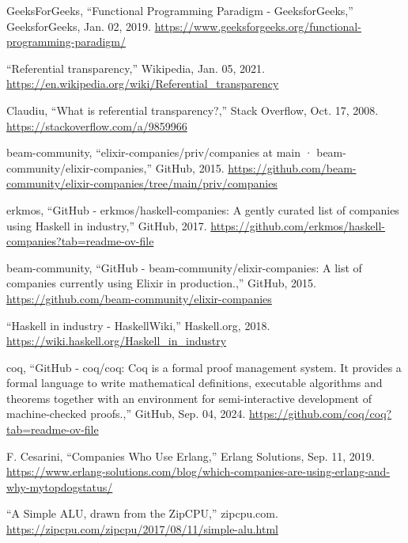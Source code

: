 \documentclass[12pt]{report} %
\begin{document}
\begin{singlespace}
\begin{thebibliography}{}
             GeeksForGeeks, “Functional Programming Paradigm - GeeksforGeeks,” GeeksforGeeks, Jan. 02, 2019. \href{https://www.geeksforgeeks.org/functional-programming-paradigm/}{https://www.geeksforgeeks.org/functional-programming-paradigm/}

             “Referential transparency,” Wikipedia, Jan. 05, 2021. \href{https://en.wikipedia.org/wiki/Referential\_transparency}{https://en.wikipedia.org/wiki/Referential\_transparency}

             Claudiu, “What is referential transparency?,” Stack Overflow, Oct. 17, 2008. \href{https://stackoverflow.com/a/9859966}{https://stackoverflow.com/a/9859966}

             beam-community, “elixir-companies/priv/companies at main · beam-community/elixir-companies,” GitHub, 2015. \href{https://github.com/beam-community/elixir-companies/tree/main/priv/companies}{https://github.com/beam-community/elixir-companies/tree/main/priv/companies}

             erkmos, “GitHub - erkmos/haskell-companies: A gently curated list of companies using Haskell in industry,” GitHub, 2017. \href{https://github.com/erkmos/haskell-companies?tab=readme-ov-file}{https://github.com/erkmos/haskell-companies?tab=readme-ov-file}

             beam-community, “GitHub - beam-community/elixir-companies: A list of companies currently using Elixir in production.,” GitHub, 2015. \href{https://github.com/beam-community/elixir-companies}{https://github.com/beam-community/elixir-companies}

             “Haskell in industry - HaskellWiki,” Haskell.org, 2018. \href{https://wiki.haskell.org/Haskell\_in\_industry}{https://wiki.haskell.org/Haskell\_in\_industry}

             coq, “GitHub - coq/coq: Coq is a formal proof management system. It provides a formal language to write mathematical definitions, executable algorithms and theorems together with an environment for semi-interactive development of machine-checked proofs.,” GitHub, Sep. 04, 2024. \href{https://github.com/coq/coq?tab=readme-ov-file}{https://github.com/coq/coq?tab=readme-ov-file}

             F. Cesarini, “Companies Who Use Erlang,” Erlang Solutions, Sep. 11, 2019. \href{https://www.erlang-solutions.com/blog/which-companies-are-using-erlang-and-why-mytopdogstatus/}{https://www.erlang-solutions.com/blog/which-companies-are-using-erlang-and-why-mytopdogstatus/}

             “A Simple ALU, drawn from the ZipCPU,” zipcpu.com. \href{https://zipcpu.com/zipcpu/2017/08/11/simple-alu.html}{https://zipcpu.com/zipcpu/2017/08/11/simple-alu.html}

        \end{thebibliography}

    \end{singlespace}

    \appendix
        
    
    
    
\end{document}
